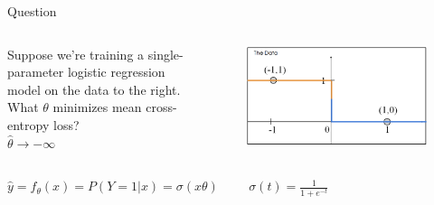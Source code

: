 \documentclass[aspectratio=169]{../latex_main/tntbeamer}  %
\begin{document}
	
	\begin{frame}{Question}
	    \begin{columns}
	        \begin{column}{.5\textwidth}
	              Suppose we’re training a single-parameter logistic regression model on the data to the right.\\
	              \bigskip
	              What $\theta$ minimizes mean cross-entropy loss?\\
	              \bigskip
	              $\hat{\theta} \rightarrow -\infty$
	        \end{column}
	        
	        
	        
	        \begin{column}{.5\textwidth}
	                \begin{figure}
	                    \centering
	                    \includegraphics[scale=.35]{Bild41}
	                \end{figure}
	                
	        \end{column}
	    \end{columns}
	    \bigskip
	    $\hat{y} = f_\theta (x) = P(Y=1|x) = \sigma (x\theta) \hspace{1cm} \sigma (t) = \frac{1}{1 + e^{-t}}$
	\end{frame}
	
\end{document}
